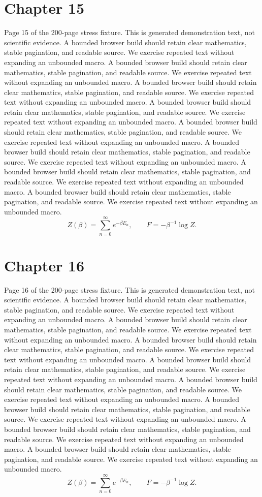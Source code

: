 \documentclass[11pt]{article}
\begin{document}
\section*{Chapter 15}
Page 15 of the 200-page stress fixture. This is generated demonstration text, not scientific evidence.
A bounded browser build should retain clear mathematics, stable pagination, and readable source. We exercise repeated text without expanding an unbounded macro.
A bounded browser build should retain clear mathematics, stable pagination, and readable source. We exercise repeated text without expanding an unbounded macro.
A bounded browser build should retain clear mathematics, stable pagination, and readable source. We exercise repeated text without expanding an unbounded macro.
A bounded browser build should retain clear mathematics, stable pagination, and readable source. We exercise repeated text without expanding an unbounded macro.
A bounded browser build should retain clear mathematics, stable pagination, and readable source. We exercise repeated text without expanding an unbounded macro.
A bounded browser build should retain clear mathematics, stable pagination, and readable source. We exercise repeated text without expanding an unbounded macro.
A bounded browser build should retain clear mathematics, stable pagination, and readable source. We exercise repeated text without expanding an unbounded macro.
A bounded browser build should retain clear mathematics, stable pagination, and readable source. We exercise repeated text without expanding an unbounded macro.
\[Z(\beta)=\sum_{n=0}^{\infty}e^{-\beta E_n},\qquad F=-\beta^{-1}\log Z.\]
\newpage
\section*{Chapter 16}
Page 16 of the 200-page stress fixture. This is generated demonstration text, not scientific evidence.
A bounded browser build should retain clear mathematics, stable pagination, and readable source. We exercise repeated text without expanding an unbounded macro.
A bounded browser build should retain clear mathematics, stable pagination, and readable source. We exercise repeated text without expanding an unbounded macro.
A bounded browser build should retain clear mathematics, stable pagination, and readable source. We exercise repeated text without expanding an unbounded macro.
A bounded browser build should retain clear mathematics, stable pagination, and readable source. We exercise repeated text without expanding an unbounded macro.
A bounded browser build should retain clear mathematics, stable pagination, and readable source. We exercise repeated text without expanding an unbounded macro.
A bounded browser build should retain clear mathematics, stable pagination, and readable source. We exercise repeated text without expanding an unbounded macro.
A bounded browser build should retain clear mathematics, stable pagination, and readable source. We exercise repeated text without expanding an unbounded macro.
A bounded browser build should retain clear mathematics, stable pagination, and readable source. We exercise repeated text without expanding an unbounded macro.
\[Z(\beta)=\sum_{n=0}^{\infty}e^{-\beta E_n},\qquad F=-\beta^{-1}\log Z.\]
\newpage
\end{document}
